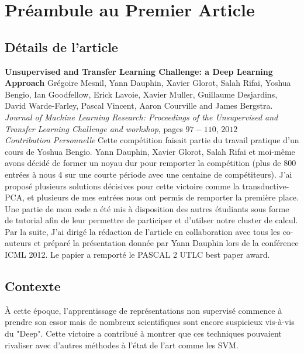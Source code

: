 \chapter{Pr\'{e}ambule au Premier Article }

\section{D\'{e}tails de l'article}

{\bf Unsupervised and Transfer Learning Challenge: a Deep Learning Approach}
Gr\'{e}goire Mesnil, Yann Dauphin, Xavier Glorot, Salah Rifai, Yoshua Bengio,
Ian Goodfellow, Erick Lavoie, Xavier Muller, Guillaume Desjardins, David
Warde-Farley, Pascal Vincent, Aaron Courville and James Bergstra. {\it Journal
of Machine Learning Research: Proceedings of the Unsupervised and Transfer
Learning Challenge and workshop}, pages $97-110$, $2012$ \\

{\it Contribution Personnelle} Cette comp\'{e}tition faisait partie du travail
pratique d'un cours de Yoshua Bengio. Yann Dauphin, Xavier Glorot, Salah Rifai
et moi-m\^{e}me avons d\'{e}cid\'{e} de former un noyau dur pour remporter la comp\'{e}tition
(plus de 800 entr\'{e}es \`{a} nous 4 sur une courte p\'{e}riode avec une centaine de comp\'{e}titeurs).
J'ai propos\'{e} plusieurs solutions d\'{e}cisives pour cette victoire comme la
transductive-PCA, et plusieurs de mes entr\'{e}es nous ont permis de remporter la
premi\`{e}re place. Une partie de mon code a \'{e}t\'{e} mis \`{a} disposition des autres
\'{e}tudiants sous forme de tutorial afin de leur permettre de participer et
d'utilser notre cluster de calcul. Par la suite, J'ai dirig\'{e} la r\'{e}daction de
l'article en collaboration avec tous les co-auteurs et pr\'{e}par\'{e} la pr\'{e}sentation
donn\'{e}e par Yann Dauphin lors de la conf\'{e}rence ICML 2012. Le papier a remport\'{e}
le PASCAL 2 UTLC best paper award. 

\section{Contexte}

\`{A} cette \'{e}poque, l'apprentissage de repr\'{e}sentations non supervis\'{e} commence \`{a}
prendre son essor mais de nombreux scientifiques sont encore suspicieux
vis-\`{a}-vis du "Deep". Cette victoire a contribu\'{e} \`{a} montrer que ces techniques
pouvaient rivaliser avec d'autres m\'{e}thodes \`{a} l'\'{e}tat de l'art comme les SVM.

